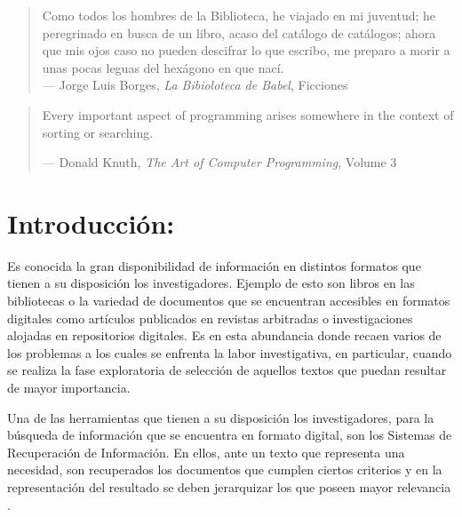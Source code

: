\documentclass[
  12pt,
  openany]{book}
\begin{document}
\newpage
\thispagestyle{empty}
\vspace*{5cm}
\hfill
\begin{minipage}{0.70\textwidth}
\begin{quote}
Como todos los hombres de la Biblioteca, he viajado en mi juventud; he peregrinado en busca de un libro, acaso del catálogo de catálogos; ahora que mis ojos caso no pueden descifrar lo que escribo, me preparo a morir a unas pocas leguas del hexágono en que nací.\\
--- Jorge Luis Borges, \textit{La Bibioloteca de Babel}, Ficciones
\end{quote}
\hspace*{2cm}

\begin{quote}
Every important aspect of programming arises somewhere in the context of sorting or searching.

--- Donald Knuth, \textit{The Art of Computer Programming}, Volume 3
\end{quote}
\end{minipage}

\thispagestyle{empty}
\maketitle



{
\setcounter{tocdepth}{4}
\tableofcontents
}
\listoffigures
\listoftables
\clearpage
{}

\hypertarget{introduccion}{%
\chapter{Introducción:}\label{introduccion}}

Es conocida la gran disponibilidad de información en distintos formatos que tienen a su disposición los investigadores. Ejemplo de esto son libros en las bibliotecas o la variedad de documentos que se encuentran accesibles en formatos digitales como artículos publicados en revistas arbitradas o investigaciones alojadas en repositorios digitales. Es en esta abundancia donde recaen varios de los problemas a los cuales se enfrenta la labor investigativa, en particular, cuando se realiza la fase exploratoria de selección de aquellos textos que puedan resultar de mayor importancia.

Una de las herramientas que tienen a su disposición los investigadores, para la búsqueda de información que se encuentra en formato digital, son los Sistemas de Recuperación de Información. En ellos, ante un texto que representa una necesidad, son recuperados los documentos que cumplen ciertos criterios y en la representación del resultado se deben jerarquizar los que poseen mayor relevancia \citep{manning2008}.
\end{document}
